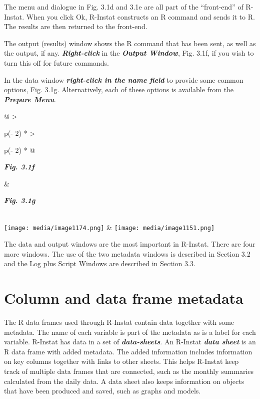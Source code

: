 \documentclass[
  letterpaper,
  DIV=11,
  numbers=noendperiod]{scrreprt}
\begin{document}
The menu and dialogue in Fig. 3.1d and 3.1e are all part of the
``front-end'' of R-Instat. When you click Ok, R-Instat constructs an R
command and sends it to R. The results are then returned to the
front-end.

The output (results) window shows the R command that has been sent, as
well as the output, if any. \textbf{\emph{Right-click}} in the
\textbf{\emph{Output Window}}, Fig. 3.1f, if you wish to turn this off
for future commands.

In the data window \textbf{\emph{right-click in the name field}} to
provide some common options, Fig. 3.1g. Alternatively, each of these
options is available from the \textbf{\emph{Prepare Menu}}.

\begin{longtable}[]{@{}
  >{\raggedright\arraybackslash}p{(\columnwidth - 2\tabcolsep) * }
  >{\raggedright\arraybackslash}p{(\columnwidth - 2\tabcolsep) * }@{}}
\toprule\noalign{}
\begin{minipage}[b]{\linewidth}\raggedright
\textbf{\emph{Fig. 3.1f}}
\end{minipage} & \begin{minipage}[b]{\linewidth}\raggedright
\textbf{\emph{Fig. 3.1g}}
\end{minipage} \\
\midrule\noalign{}
\endhead
\bottomrule\noalign{}
\endlastfoot
\texttt{[image: media/image1174.png]}
&
\texttt{[image: media/image1151.png]} \\
\end{longtable}

The data and output windows are the most important in R-Instat. There
are four more windows. The use of the two metadata windows is described
in Section 3.2 and the Log plus Script Windows are described in Section
3.3.

\section{Column and data frame
metadata}\label{column-and-data-frame-metadata}

The R data frames used through R-Instat contain data together with some
metadata. The name of each variable is part of the metadata as is a
label for each variable. R-Instat has data in a set of
\textbf{\emph{data-sheets}}. An R-Instat \textbf{\emph{data sheet}} is
an R data frame with added metadata. The added information includes
information on key columns together with links to other sheets. This
helps R-Instat keep track of multiple data frames that are connected,
such as the monthly summaries calculated from the daily data. A data
sheet also keeps information on objects that have been produced and
saved, such as graphs and models.
\end{document}
